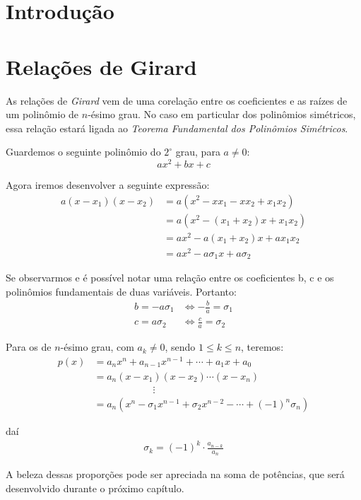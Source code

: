 \textual

\chapter{Introdução}

\chapter{Relações de Girard}
\par
As relações de \textit{Girard} vem de uma corelação entre os coeficientes e as raízes de um polinômio de $n$-ésimo grau.
No caso em particular dos polinômios simétricos, essa relação estará ligada ao \textit{Teorema Fundamental dos Polinômios Simétricos}.
\par
{} Guardemos o seguinte polinômio do $2^\circ$ grau, para $a \neq 0$:
\[ ax^2 + bx + c \]
\par
{} Agora iremos desenvolver a seguinte expressão:
\begin{align*}
    a(x - x_1)(x - x_2) &= a(x^2 - xx_1 - xx_2 + x_1x_2) \\
    &= a(x^2 - (x_1 + x_2)x + x_1x_2) \\
	&= ax^2 - a(x_1 + x_2)x +  ax_1x_2 \\
	&= ax^2 - a\sigma_1x +  a\sigma_2
\end{align*}
\par
Se observarmos  e  é possível notar uma relação entre os coeficientes b, c e os polinômios fundamentais de duas variáveis.
Portanto:
\begin{align*}
    b = -a\sigma_1 &\iff -\frac{b}{a} = \sigma_1\\
	c = a\sigma_2 &\iff \frac{c}{a} =\sigma_2
\end{align*}
\par
Para os de $n$-ésimo grau, com $a_k \neq 0$, sendo $1 \leq k \leq n$, teremos:
\begin{align*}
	p(x) &= a_n x^n + a_{n-1} x^{n-1} + \cdots + a_1 x + a_0 \\
	&= a_n(x - x_1)(x - x_2)\cdots(x - x_n)\\
	& \qquad \qquad \qquad \vdots \\
	&= a_n \left( x^n - \sigma_1 x^{n-1} + \sigma_2 x^{n-2} - \cdots + (-1)^n \sigma_n \right)
\end{align*}
\par daí
\begin{align*}
	\sigma_k = (-1)^k \cdot \frac{a_{n-k}}{a_n}
\end{align*}
\par
A beleza dessas proporções pode ser apreciada na soma de potências, que será desenvolvido durante o próximo capítulo. 

